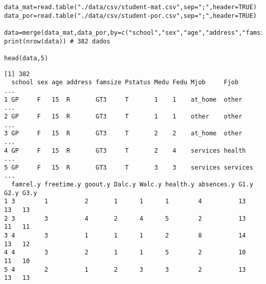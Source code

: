 \documentclass[11pt]{article}
\begin{document}
\begin{verbatim}
data_mat=read.table("./data/csv/student-mat.csv",sep=";",header=TRUE)
data_por=read.table("./data/csv/student-por.csv",sep=";",header=TRUE)

data=merge(data_mat,data_por,by=c("school","sex","age","address","famsize","Pstatus","Medu","Fedu","Mjob","Fjob","reason","nursery","internet"))
print(nrow(data)) # 382 dados

head(data,5)
\end{verbatim}

\begin{verbatim}
[1] 382
  school sex age address famsize Pstatus Medu Fedu Mjob     Fjob     ...
1 GP     F   15  R       GT3     T       1    1    at_home  other    ...
2 GP     F   15  R       GT3     T       1    1    other    other    ...
3 GP     F   15  R       GT3     T       2    2    at_home  other    ...
4 GP     F   15  R       GT3     T       2    4    services health   ...
5 GP     F   15  R       GT3     T       3    3    services services ...
  famrel.y freetime.y goout.y Dalc.y Walc.y health.y absences.y G1.y G2.y G3.y
1 3        1          2       1      1      1        4          13   13   13  
2 3        3          4       2      4      5        2          13   11   11  
3 4        3          1       1      1      2        8          14   13   12  
4 4        3          2       1      1      5        2          10   11   10  
5 4        2          1       2      3      3        2          13   13   13  
\end{verbatim}
\end{document}
